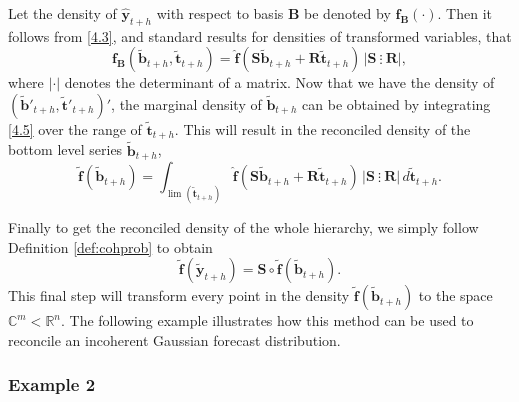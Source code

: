 \documentclass[a4paper, 11pt]{article}
\begin{document}
Let the density of $\hat{\bm{y}}_{t+h}$ with respect to basis $\bm{B}$ be denoted by $\bm{f_B}(\cdot)$. Then it follows from  \eqref{4.3}, and standard results for densities of transformed variables, that
\begin{equation}\label{4.5}
\bm{f_B}(\tilde{\bm{b}}_{t+h},\tilde{\bm{t}}_{t+h})=\hat{\bm{f}}(\bm{S}\tilde{\bm{b}}_{t+h}+\bm{R}\tilde{\bm{t}}_{t+h}) \,\Big|\bm{S} ~ \vdots~ \bm{R}\Big|,
\end{equation}
where $|\cdot|$ denotes the determinant of a matrix. Now that we have the density of $(\tilde{\bm{b}}'_{t+h} , \tilde{\bm{t}}'_{t+h})'$, the marginal density of $\tilde{\bm{b}}_{t+h}$ can be obtained by integrating \eqref{4.5} over the range of $\tilde{\bm{t}}_{t+h}$. This will result in the reconciled density of the bottom level series $\tilde{\bm{b}}_{t+h}$,
\begin{equation}\label{4.6}
\tilde{\bm{f}}(\tilde{\bm{b}}_{t+h})=\int_{\lim(\tilde{\bm{t}}_{t+h})}\hat{\bm{f}}(\bm{S}\tilde{\bm{b}}_{t+h}+\bm{R}\tilde{\bm{t}}_{t+h})\,  \Big|\bm{S} ~ \vdots~ \bm{R}\Big| \, d\tilde{\bm{t}}_{t+h}.
\end{equation}

Finally to get the reconciled density of the whole hierarchy, we simply follow Definition \ref{def:cohprob} to obtain
\begin{equation}\label{4.7}
\tilde{\bm{f}}(\tilde{\bm{y}}_{t+h})=\bm{S}\circ \tilde{\bm{f}}(\tilde{\bm{b}}_{t+h}).
\end{equation}
This final step will transform every point in the density $\tilde{\bm{f}}(\tilde{\bm{b}}_{t+h})$ to the space $\mathbb{C}^m<\mathbb{R}^n$. The following example illustrates how this method can be used to reconcile an incoherent Gaussian forecast distribution.

\subsubsection*{Example 2}
\end{document}
